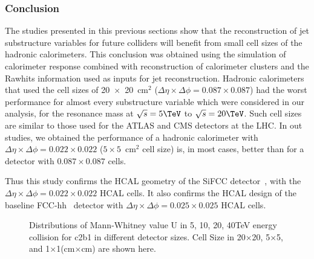 \documentclass[12pt,twoside,a4paper,an,final]{cms-tdr}
\begin{document}
\subsubsection{Conclusion}
The studies presented in this previous sections show that the reconstruction of jet substructure 
variables for future colliders will benefit from small cell sizes of the hadronic calorimeters. 
This conclusion was obtained using the simulation of calorimeter response combined with reconstruction of 
calorimeter clusters and the Rawhits information used as inputs for jet reconstruction. 
Hadronic calorimeters that used the cell sizes of 20~$\times $~20~cm$^2$ ($\Delta \eta \times \Delta \phi = 0.087\times 0.087$) 
had the worst performance for almost every 
substructure variable which were considered in our analysis, for the resonance mass at $\sqrt{s} = 5\TeV$ to $\sqrt{s} = 20\TeV$. 
Such cell sizes are similar to those used for the ATLAS and CMS detectors at the LHC. 
In out studies, we obtained the performance of a hadronic calorimeter with 
$\Delta \eta \times \Delta \phi = 0.022\times0.022$ ($5 \times 5$~$\mathrm{cm}^2$ cell size) is, in most cases,
better than for a detector with $0.087\times 0.087$ cells.

Thus this study confirms the  HCAL geometry of the SiFCC detector~\cite{Chekanov:2016ppq},
with the $\Delta \eta \times \Delta \phi = 0.022\times0.022$ HCAL cells.
It also confirms the HCAL design of the baseline FCC-hh~\cite{fcc1,fcc2} detector with
$\Delta \eta \times \Delta \phi = 0.025\times0.025$ HCAL cells.
\begin{figure}
\begin{center}
   \end{center}
\caption{Distributions of Mann-Whitney value U in 5, 10, 20, 40TeV energy collision for c2b1 in different detector sizes. Cell Size in 20$\times$20, 5$\times$5, and 1$\times$1(cm$\times$cm) are shown here.}
\label{fig:Rawhit_05GeV_c2b1_Dis}
\end{figure}
\end{document}
